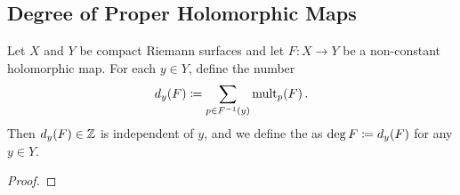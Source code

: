 \documentclass[../Moduli_Spaces_of_Riemann_Surfaces.tex]{subfiles}
\begin{document}
    \subsection{Degree of Proper Holomorphic Maps}
    \begin{defprop}
        Let $X$ and $Y$ be compact Riemann surfaces and let $F:X\to Y$ be a non-constant holomorphic map. For each $y\in Y$, define the number
        \begin{equation*}
            d_y\!\left(F\right)\coloneqq\sum_{p\in F^{-1}\left(y\right)}\operatorname{mult}_p\!\left(F\right).
        \end{equation*}
        Then $d_y\!\left(F\right)\in\mathbb{Z}$ is independent of $y$, and we define the  as $\deg F\coloneqq d_y\!\left(F\right)$ for any $y\in Y$.
    \end{defprop}
    \begin{proof}
        
    \end{proof}
\end{document}
